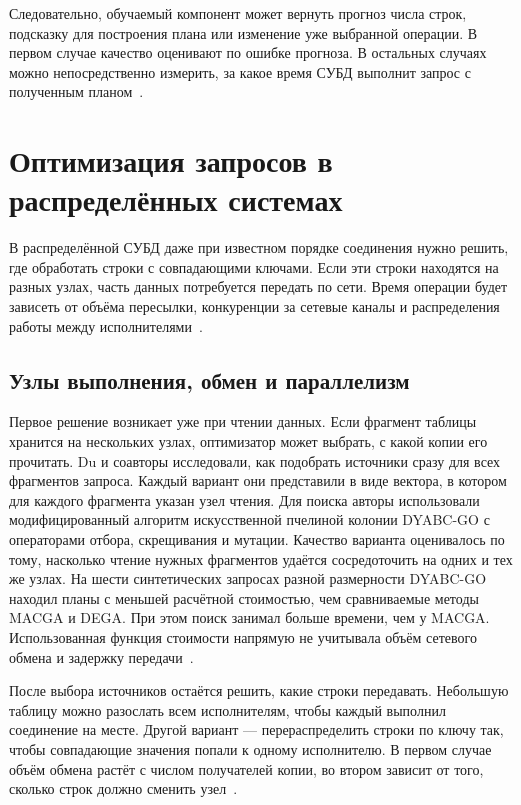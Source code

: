 \documentclass[a4paper, final]{article}
\begin{document}
	Следовательно, обучаемый компонент может вернуть прогноз числа строк, подсказку для построения плана или изменение уже выбранной операции. В первом случае качество оценивают по ошибке прогноза. В остальных случаях можно непосредственно измерить, за какое время СУБД выполнит запрос с полученным планом~\cite{wang2024,autoquo2024,loopline2025,foss2024}.
	
	
	\newpage
	\section{Оптимизация запросов в распределённых системах}
	
	В распределённой СУБД даже при известном порядке соединения нужно решить, где обработать строки с совпадающими ключами. Если эти строки находятся на разных узлах, часть данных потребуется передать по сети. Время операции будет зависеть от объёма пересылки, конкуренции за сетевые каналы и распределения работы между исполнителями~\cite{liang2024,coflop2023,prpq2017}.
	
	\subsection{Узлы выполнения, обмен и параллелизм}
	
	Первое решение возникает уже при чтении данных. Если фрагмент таблицы хранится на нескольких узлах, оптимизатор может выбрать, с какой копии его прочитать. Du и соавторы исследовали, как подобрать источники сразу для всех фрагментов запроса. Каждый вариант они представили в виде вектора, в котором для каждого фрагмента указан узел чтения. Для поиска авторы использовали модифицированный алгоритм искусственной пчелиной колонии DYABC-GO с операторами отбора, скрещивания и мутации. Качество варианта оценивалось по тому, насколько чтение нужных фрагментов удаётся сосредоточить на одних и тех же узлах. На шести синтетических запросах разной размерности DYABC-GO находил планы с меньшей расчётной стоимостью, чем сравниваемые методы MACGA и DEGA. При этом поиск занимал больше времени, чем у MACGA. Использованная функция стоимости напрямую не учитывала объём сетевого обмена и задержку передачи~\cite{du2024}.
	
	После выбора источников остаётся решить, какие строки передавать. Небольшую таблицу можно разослать всем исполнителям, чтобы каждый выполнил соединение на месте. Другой вариант --- перераспределить строки по ключу так, чтобы совпадающие значения попали к одному исполнителю. В первом случае объём обмена растёт с числом получателей копии, во втором зависит от того, сколько строк должно сменить узел~\cite{liang2024}.
	
\end{document}
